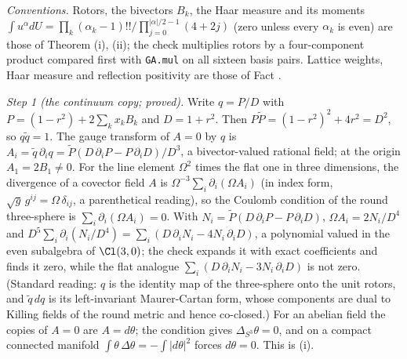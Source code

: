 \emph{Conventions.} Rotors, the bivectors $B_{k}$, the Haar measure and its moments $\int u^{\alpha}dU = \prod_{k}(\alpha_{k} - 1)!!/\prod_{j=0}^{|\alpha|/2 - 1}(4 + 2j)$ (zero unless every $\alpha_{k}$ is even) are those of Theorem (i), (ii); the check multiplies rotors by a four-component product compared first with \texttt{GA.mul} on all sixteen basis pairs. Lattice weights, Haar measure and reflection positivity are those of Fact .

\emph{Step 1 (the continuum copy; proved).} Write $q = P/D$ with $P = (1 - r^{2}) + 2\sum_{k}x_{k}B_{k}$ and $D = 1 + r^{2}$. Then $P\widetilde P = (1 - r^{2})^{2} + 4r^{2} = D^{2}$, so $q\widetilde q = 1$. The gauge transform of $A = 0$ by $q$ is $A_{i} = \widetilde q\,\partial_{i}q = \widetilde P(D\,\partial_{i}P - P\,\partial_{i}D)/D^{3}$, a bivector-valued rational field; at the origin $A_{1} = 2B_{1} \neq 0$. For the line element $\Omega^{2}$ times the flat one in three dimensions, the divergence of a covector field $A$ is $\Omega^{-3}\sum_{i}\partial_{i}(\Omega A_{i})$ (in index form, $\sqrt{g}\,g^{ij} = \Omega\,\delta_{ij}$, a parenthetical reading), so the Coulomb condition of the round three-sphere is $\sum_{i}\partial_{i}(\Omega A_{i}) = 0$. With $N_{i} = \widetilde P(D\,\partial_{i}P - P\,\partial_{i}D)$, $\Omega A_{i} = 2N_{i}/D^{4}$ and $D^{5}\sum_{i}\partial_{i}(N_{i}/D^{4}) = \sum_{i}(D\,\partial_{i}N_{i} - 4N_{i}\,\partial_{i}D)$, a polynomial valued in the even subalgebra of $\Cl(3,0)$; the check expands it with exact coefficients and finds it zero, while the flat analogue $\sum_{i}(D\,\partial_{i}N_{i} - 3N_{i}\,\partial_{i}D)$ is not zero. (Standard reading: $q$ is the identity map of the three-sphere onto the unit rotors, and $\widetilde q\,dq$ is its left-invariant Maurer-Cartan form, whose components are dual to Killing fields of the round metric and hence co-closed.) For an abelian field the copies of $A = 0$ are $A = d\theta$; the condition gives $\Delta_{S^{3}}\theta = 0$, and on a compact connected manifold $\int\theta\,\Delta\theta = -\int|d\theta|^{2}$ forces $d\theta = 0$. This is (i).


